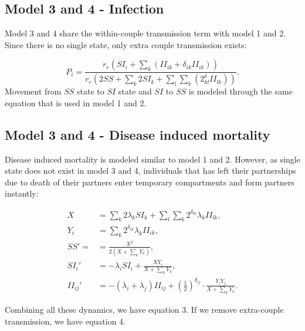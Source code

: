 \documentclass[10pt,letterpaper]{article}
\newcommand{\khalf}{\left(\frac{1}{2}\right)^{\delta_{ij}}}  %
\begin{document}
\subsection*{Model 3 and 4 - Infection}

Model 3 and 4 share the within-couple transmission term with model 1 and 2. Since there is no single state, only extra couple transmission exists:

\begin{equation}
P_i = \frac{r_e (SI_i + \sum_k (II_{ik} + \delta_{ik} II_{ik}))}{r_e(2 SS + \sum_k 2 SI_k + \sum_l \sum_k (2^\delta_{kl} II_{lk}) )}.
\end{equation}
Movement from $SS$ state to $SI$ state and $SI$ to $SS$ is modeled through the same equation that is used in model 1 and 2.

\subsection*{Model 3 and 4 - Disease induced mortality}

Disease induced mortality is modeled similar to model 1 and 2. However, as single state does not exist in model 3 and 4, individuals that has left their partnerships due to death of their partners enter temporary compartments and form partners instantly:

\begin{equation}
\begin{aligned}
X &= \sum_k 2 \lambda_k SI_k + \sum_l \sum_k 2^{\delta_{lk}}  \lambda_k II_{lk}, \\
Y_i &=  \sum_k  2^{\delta_{ik}}  \lambda_k II_{ik}, \\
SS' = &= \frac{X^2}{2 (X + \sum_k Y_k)},\\
SI_i' &= - \lambda_i SI_i + \frac{X Y_i}{X + \sum_k Y_k},\\
II_{ij}' &= -(\lambda_i + \lambda_j) II_{ij} + \khalf \cdot \frac{Y_i Y_j}{X + \sum_k Y_k}.
\end{aligned}
\end{equation}

Combining all these dynamics, we have equation 3. If we remove extra-couple transmission, we have equation 4.
\end{document}
